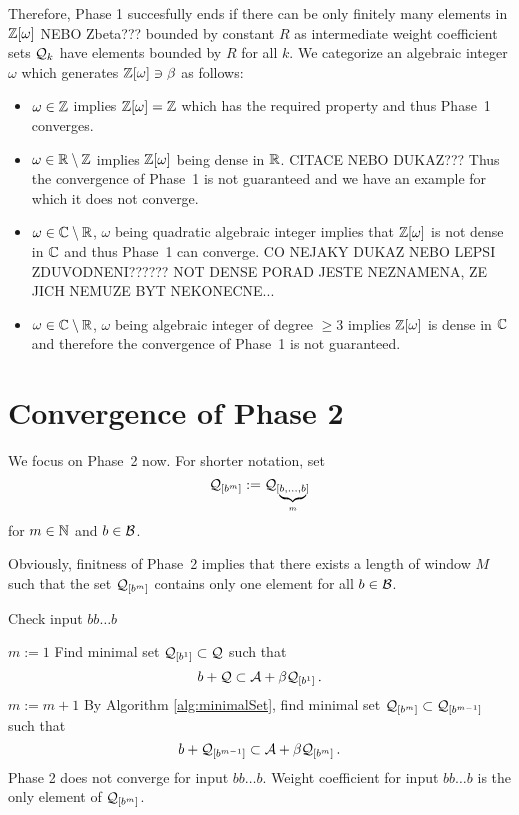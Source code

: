 Therefore, Phase 1 succesfully ends if there can be only finitely many elements in $\mathbb{Z}[\omega]$ NEBO Zbeta??? bounded by constant $R$ as intermediate weight coefficient sets $\mathcal{Q}_k$ have elements bounded by $R$ for all $k$. 
We categorize an algebraic integer $\omega$ which generates $\mathbb{Z}[\omega] \ni \beta$ as follows:
\begin{itemize}
    \item $\omega \in \mathbb{Z}$ implies $\mathbb{Z}[\omega]=\mathbb{Z}$ which has the required property and thus Phase~1 converges.
    \item $\omega \in \mathbb{R}\setminus\mathbb{Z}$ implies $\mathbb{Z}[\omega]$ being dense in $\mathbb{R}$. CITACE NEBO DUKAZ??? Thus the convergence of Phase~1 is not guaranteed and we have an example for which it does not converge.
    \item $\omega \in \mathbb{C}\setminus\mathbb{R}$, $\omega$ being quadratic algebraic integer implies that $\mathbb{Z}[\omega]$ is not dense in $\mathbb{C}$ and thus Phase~1 can converge. CO NEJAKY DUKAZ NEBO LEPSI ZDUVODNENI?????? NOT DENSE PORAD JESTE NEZNAMENA, ZE JICH NEMUZE BYT NEKONECNE...
    \item $\omega \in \mathbb{C}\setminus\mathbb{R}$, $\omega$ being algebraic integer of degree $\geq 3$ implies $\mathbb{Z}[\omega]$ is  dense in $\mathbb{C}$ and therefore the convergence of Phase~1 is not guaranteed.
\end{itemize}

\section{Convergence of Phase 2}
\label{sec:convergencePhase2}
We focus on Phase~2 now. For shorter notation, set 
$$
\mathcal{Q}_{[b^{m}]}:=\mathcal{Q}_{[\underbrace{\scriptstyle b,\dots,b}_m]}
$$ for $m \in \mathbb{N}$ and $b\in\mathcal{B}$.

Obviously, finitness of Phase~2 implies that there exists a length of window $M$ such that the set $\mathcal{Q}_{[b^{m}]}$ contains only one element for all $b\in\mathcal{B}$. 

\begin{algorithm}
  \caption{Check input $bb\dots b$}
    \label{alg:oneletterSets}
  \begin{algorithmic}[1]
    \STATE $m:=1$
    \STATE Find minimal set $\mathcal{Q}_{[b^{1}]} \subset \mathcal{Q}$ such that
      $$
      b + \mathcal{Q} \subset \mathcal{A} + \beta \mathcal{Q}_{[b^{1}]}\,.
      $$
      \vspace{-20pt}
        \STATE $m:= m +1$
        \STATE By Algorithm \ref{alg:minimalSet}, find minimal set $\mathcal{Q}_{[b^{m}]} \subset \mathcal{Q}_{[b^{m-1}]}$ such that
          $$
          b + \mathcal{Q}_{[b^{m-1}]} \subset \mathcal{A} + \beta \mathcal{Q}_{[b^{m}]}\,.
          $$  
          \vspace{-20pt}
            \RETURN Phase 2 does not converge for input $bb\dots b$.
        \ENDIF
    \ENDWHILE  
    \RETURN Weight coefficient for input $bb\dots b$ is the only element of $\mathcal{Q}_{[b^{m}]}$.
  \end{algorithmic}
\end{algorithm}

